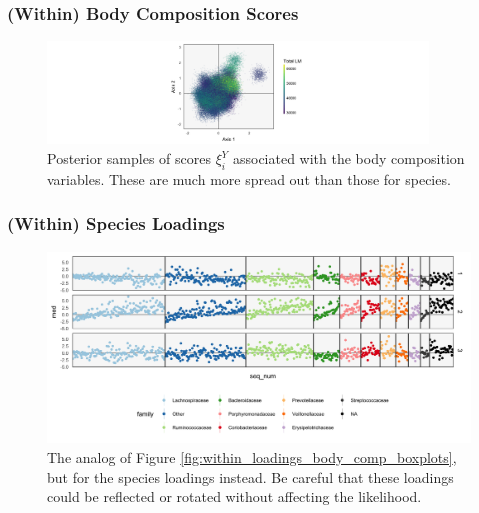 \documentclass{beamer}
\begin{document}
\begin{frame}
  \frametitle{(Within) Body Composition Scores}
 \begin{figure}[ht]
   \centering
   \includegraphics[width=0.9\textwidth]{figure/unshared_scores_lm_posterior}
   \caption{Posterior samples of scores $\xi^{Y}_i$ associated with the body
     composition variables. These are much more spread out than those for
     species. \label{fig:unshared_scores_lm_posterior} }
 \end{figure}
\end{frame}

\begin{frame}
  \frametitle{(Within) Species Loadings}
\begin{figure}[ht]
  \centering
  \includegraphics[width=\textwidth]{figure/within_loadings_seq_boxplots}
  \caption{The analog of Figure \ref{fig:within_loadings_body_comp_boxplots},
    but for the species loadings
    instead. Be careful that these loadings could be reflected or rotated
    without affecting the likelihood. \label{fig:within_loadings_seq_boxplots} }
\end{figure}
\end{frame}
\end{document}
